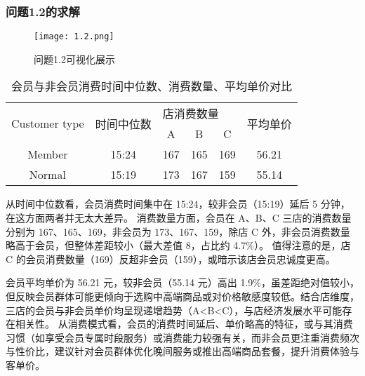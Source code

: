 \documentclass[withoutpreface,bwprint]{cumcmthesis}
\begin{document}
\subsubsection {问题1.2的求解}
\begin{figure}[H]
\centering
\texttt{[image: 1.2.png]}
\caption{问题1.2可视化展示}
\label{fig:单图}
\end{figure}
\begin{table}[H]
    \caption{会员与非会员消费时间中位数、消费数量、平均单价对比}%
    \centering
    \fontsize{12}{14}\selectfont 
\begin{tabular}{cccccc}
\toprule[1.5pt]
    \multirow{2}{*}{Customer type}& \multirow{2}{*}{时间中位数} & \multicolumn{3}{l}{店消费数量} & \multirow{2}{*}{平均单价} \\ \cline{3-5}
    &                        & A      & B     & C     &                       \\ \midrule[1pt]
Member  & 15:24                  & 167    & 165   & 169   & 56.21                 \\
Normal & 15:19                  & 173    & 167   & 159   & 55.14                 \\ \bottomrule[1.5pt]
\end{tabular}
\end{table}
从时间中位数看，会员消费时间集中在 15:24，较非会员（15:19）延后 5 分钟，在这方面两者并无太大差异。
消费数量方面，会员在 A、B、C 三店的消费数量分别为 167、165、169，非会员为 173、167、159，除店 C 外，非会员消费数量略高于会员，但整体差距较小（最大差值 8，占比约 4.7\%）。
值得注意的是，店 C 的会员消费数量（169）反超非会员（159），或暗示该店会员忠诚度更高。
\par
会员平均单价为 56.21 元，较非会员（55.14 元）高出 1.9\%，虽差距绝对值较小，但反映会员群体可能更倾向于选购中高端商品或对价格敏感度较低。结合店维度，三店的会员与非会员单价均呈现递增趋势（A<B<C），与店经济发展水平可能存在相关性。
从消费模式看，会员的消费时间延后、单价略高的特征，或与其消费习惯（如享受会员专属时段服务）或消费能力较强有关，而非会员更注重消费频次与性价比，建议针对会员群体优化晚间服务或推出高端商品套餐，提升消费体验与客单价。
\end{document}
